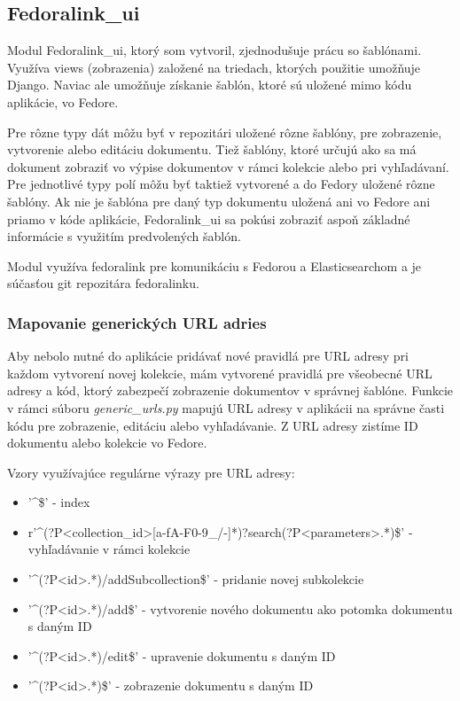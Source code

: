 \documentclass[thesis=M,slovak]{FITthesis}[2013/05/06]
\begin{document}
\subsection{Fedoralink\_ui}
Modul Fedoralink\_ui, ktorý som vytvoril, zjednodušuje prácu so šablónami. Využíva views (zobrazenia) založené na triedach, ktorých použitie umožňuje Django. Naviac ale umožňuje získanie šablón, ktoré sú uložené mimo kódu aplikácie, vo Fedore. 

Pre rôzne typy dát môžu byť v repozitári uložené rôzne šablóny, pre zobrazenie, vytvorenie alebo editáciu dokumentu. Tiež šablóny, ktoré určujú ako sa má dokument zobraziť vo výpise dokumentov v rámci kolekcie alebo pri vyhľadávaní. Pre jednotlivé typy polí môžu byť taktiež vytvorené a do Fedory uložené rôzne šablóny. Ak nie je šablóna pre daný typ dokumentu uložená ani vo Fedore ani priamo v kóde aplikácie, Fedoralink\_ui sa pokúsi zobraziť aspoň základné informácie s využitím predvolených šablón. 

Modul využíva fedoralink pre komunikáciu s Fedorou a Elasticsearchom a je súčasťou git repozitára fedoralinku.

\subsubsection{Mapovanie generických URL adries}
Aby nebolo nutné do aplikácie pridávať nové pravidlá pre URL adresy pri každom vytvorení novej kolekcie, mám vytvorené pravidlá pre všeobecné URL adresy a kód, ktorý zabezpečí zobrazenie dokumentov v správnej šablóne.
Funkcie v rámci súboru {\em generic\_urls.py} mapujú URL adresy v aplikácii na správne časti kódu pre zobrazenie, editáciu alebo vyhľadávanie. Z URL adresy zistíme ID dokumentu alebo kolekcie vo Fedore.

Vzory využívajúce regulárne výrazy pre URL adresy:
\begin{itemize}
	\item '\textasciicircum\$' - index
	\item r'\textasciicircum(?P<collection\_id>[a-fA-F0-9\_/-]*)?search(?P<parameters>.*)\$' - vyhľadávanie v rámci kolekcie
	\item '\textasciicircum(?P<id>.*)/addSubcollection\$' - pridanie novej subkolekcie
	\item '\textasciicircum(?P<id>.*)/add\$' - vytvorenie nového dokumentu ako potomka dokumentu s daným ID
	\item '\textasciicircum(?P<id>.*)/edit\$' - upravenie dokumentu s daným ID
	\item '\textasciicircum(?P<id>.*)\$' - zobrazenie dokumentu s daným ID
\end{itemize}
\end{document}
